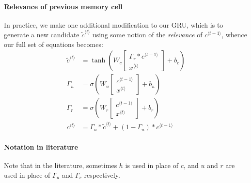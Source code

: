 \documentclass[12pt]{article}
\begin{document}
\paragraph{Relevance of previous memory cell}
In practice, we make one additional modification to our GRU, which is to generate a new candidate $\tilde c^{\langle t \rangle}$ using some notion of the \emph{relevance} of $c^{\langle t - 1 \rangle}$, whence our full set of equations becomes:
\begin{align}
  \label{eq: gruupdatebeg}
  \tilde c^{\langle t \rangle} &= \tanh \left( W_c \begin{bmatrix} \Gamma_r * c^{\langle t - 1 \rangle} \\ x^{\langle t \rangle}       \end{bmatrix} + b_c     \right) \\
  \nonumber
\Gamma_u &= \sigma\left(W_u \begin{bmatrix} c^{\langle t - 1 \rangle}     \\ x^{\langle t \rangle}   \end{bmatrix} + b_u \right) \\
\nonumber
\Gamma_r &= \sigma\left(W_r \begin{bmatrix} c^{\langle t - 1 \rangle}       \\ x^{\langle t \rangle}   \end{bmatrix} + b_r \right) \\
\label{eq: gruupdateend}
c^{\langle t \rangle} &= \Gamma_u * \tilde c^{\langle t \rangle} + (1-\Gamma_u)* c^{\langle t - 1 \rangle}
\end{align}
\paragraph{Notation in literature} Note that in the literature, sometimes $h$ is used in place of $c$, and $u$ and $r$ are used in place of $\Gamma_u$ and $\Gamma_r$ respectively.
\end{document}
